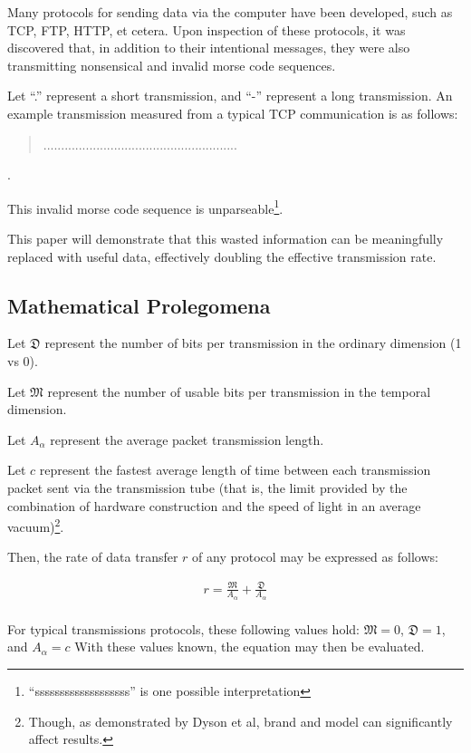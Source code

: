 \documentclass[sigplan]{acmart}
\begin{document}
Many protocols for sending data via the computer have been developed,
such as TCP, FTP, HTTP, et cetera. Upon inspection of these protocols,
it was discovered that, in addition to their intentional messages,
they were also transmitting nonsensical and invalid morse code
sequences.

Let ``.'' represent a short transmission, and ``-'' represent a long transmission.
An example transmission measured from a typical TCP communication is as follows:

\begin{quote}
.......................................................
\end{quote}.

This invalid morse code sequence is unparseable\footnote{``sssssssssssssssssss'' is one possible interpretation}.

This paper will demonstrate that this wasted information can be
meaningfully replaced with useful data, effectively doubling
the effective transmission rate.

\subsection{Mathematical Prolegomena}

Let $\mathfrak{D}$ represent the number of bits per transmission
in the ordinary dimension (1 vs 0).

Let $\mathfrak{M}$ represent the number of usable bits per transmission
in the temporal dimension.

Let $A_\alpha$ represent the average packet transmission length.

Let $c$ represent the fastest average length of time between each
transmission packet sent via the transmission tube (that is, the limit provided
by the combination of hardware construction and the speed of light
in an average vacuum)\footnote{ Though, as demonstrated by Dyson et al, brand and model can significantly
affect results.}.

Then, the rate of data transfer $r$ of any protocol may be expressed as follows:

\begin{eqnarray*}
    r = \frac{\mathfrak{M}}{A_\alpha} + \frac{\mathfrak{D}}{A_\alpha} \\
\end{eqnarray*}

For typical transmissions protocols, these following values hold:
$\mathfrak{M} = 0$, $\mathfrak{D} = 1$, and $A_\alpha = c$
With these values known, the equation may then be evaluated.
\end{document}
